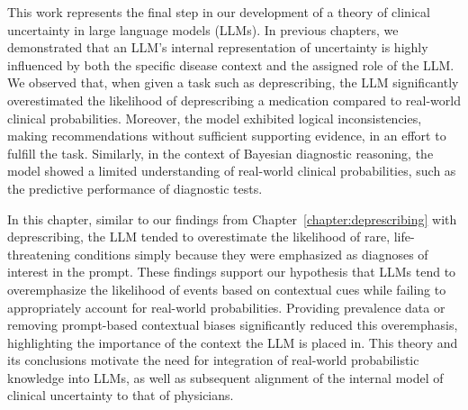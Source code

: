 This work represents the final step in our development of a theory of clinical uncertainty in large language models (LLMs). In previous chapters, we demonstrated that an LLM's internal representation of uncertainty is highly influenced by both the specific disease context and the assigned role of the LLM. We observed that, when given a task such as deprescribing, the LLM significantly overestimated the likelihood of deprescribing a medication compared to real-world clinical probabilities. Moreover, the model exhibited logical inconsistencies, making recommendations without sufficient supporting evidence, in an effort to fulfill the task. Similarly, in the context of Bayesian diagnostic reasoning, the model showed a limited understanding of real-world clinical probabilities, such as the predictive performance of diagnostic tests. 

In this chapter, similar to our findings from Chapter~\ref{chapter:deprescribing} with deprescribing, the LLM tended to overestimate the likelihood of rare, life-threatening conditions simply because they were emphasized as diagnoses of interest in the prompt. These findings support our hypothesis that LLMs tend to overemphasize the likelihood of events based on contextual cues while failing to appropriately account for real-world probabilities. Providing prevalence data or removing prompt-based contextual biases significantly reduced this overemphasis, highlighting the importance of the context the LLM is placed in. This theory and its conclusions motivate the need for integration of real-world probabilistic knowledge into LLMs, as well as subsequent alignment of the internal model of clinical uncertainty to that of physicians.

